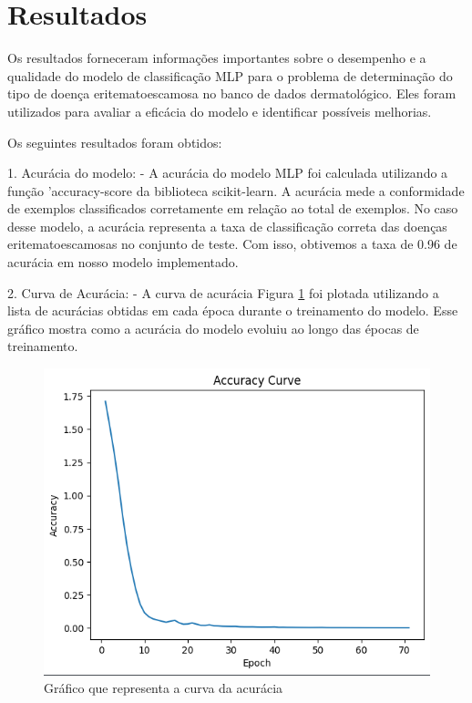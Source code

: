 \documentclass[conference]{IEEEtran}
\begin{document}
\section{Resultados}
Os resultados forneceram informações importantes sobre o desempenho e a qualidade do modelo de classificação MLP para o problema de determinação do tipo de doença eritematoescamosa no banco de dados dermatológico. Eles foram utilizados para avaliar a eficácia do modelo e identificar possíveis melhorias.

Os seguintes resultados foram obtidos:

1. Acurácia do modelo:
   - A acurácia do modelo MLP foi calculada utilizando a função 'accuracy-score da biblioteca scikit-learn. A acurácia mede a conformidade de exemplos classificados corretamente em relação ao total de exemplos. No caso desse modelo, a acurácia representa a taxa de classificação correta das doenças eritematoescamosas no conjunto de teste. Com isso, obtivemos a taxa de 0.96 de acurácia em nosso modelo implementado.

2. Curva de Acurácia:
   - A curva de acurácia Figura \ref{fig:acuracia} foi plotada utilizando a lista de acurácias obtidas em cada época durante o treinamento do modelo. Esse gráfico mostra como a acurácia do modelo evoluiu ao longo das épocas de treinamento.

\begin{figure}[htbp]
    \centerline{\includegraphics[width = 1.0\linewidth]{./figuras/figura3.png}}
    \caption{Gráfico que representa a curva da acurácia}
    \label{fig:acuracia}
\end{figure}
\end{document}
